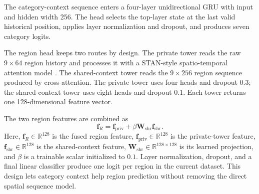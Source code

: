 The category-context sequence enters a four-layer unidirectional GRU with input and
hidden width 256. The head selects the top-layer state at the last valid historical
position, applies layer normalization and dropout, and produces seven category
logits.

The region head keeps two routes by design. The private tower reads the raw
$9\times64$ region history and processes it with a STAN-style spatio-temporal
attention model \cite{luo2021stan}. The shared-context tower reads the
$9\times256$ region sequence produced by cross-attention. The private tower uses
four heads and dropout $0.3$; the shared-context tower uses eight heads and dropout
$0.1$. Each tower returns one 128-dimensional feature vector.

The two region features are combined as
\begin{equation}
    \mathbf{f}_{R}
    =\mathbf{f}_{\mathrm{priv}}
    +\beta\mathbf{W}_{\mathrm{shr}}\mathbf{f}_{\mathrm{shr}}.
    \label{eq:apx-region-fusion}
\end{equation}
Here, $\mathbf{f}_{R}\in\mathbb{R}^{128}$ is the fused region feature,
$\mathbf{f}_{\mathrm{priv}}\in\mathbb{R}^{128}$ is the private-tower feature,
$\mathbf{f}_{\mathrm{shr}}\in\mathbb{R}^{128}$ is the shared-context feature,
$\mathbf{W}_{\mathrm{shr}}\in\mathbb{R}^{128\times128}$ is its learned projection,
and $\beta$ is a trainable scalar initialized to $0.1$. Layer normalization,
dropout, and a final linear classifier produce one logit per region in the current
dataset. This design lets category context help region prediction without removing
the direct spatial sequence model.

